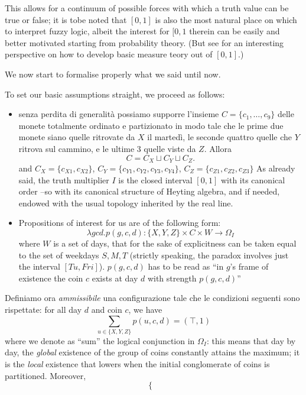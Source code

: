 \begin{example}
  This allows for a continuum of possible forces with which a truth value can be true or false;  it is tobe noted that $[0,1]$ is also the most natural place on which to interpret fuzzy logic, albeit the interest for $[0,1$ therein can be easily and better motivated starting from probability theory. (But see \cite{} for an interesting perspective on how to develop basic measure teory out of $[0,1]$.)

  We now start to formalise properly what we said until now.

  To set our basic assumptions straight, we proceed as follows:
  \begin{itemize}
    \item senza perdita di generalità possiamo supporre l'insieme $C = \{c_1,\dots,c_9\}$ delle monete totalmente ordinato e partizionato in modo tale che le prime due monete siano quelle ritrovate da $X$ il martedì, le seconde quattro quelle che $Y$ ritrova sul cammino, e le ultime 3 quelle viste da $Z$. Allora
    \[C = C_X \sqcup C_Y \sqcup C_Z.\]
    and $C_X = \{c_{X1}, c_{X2}\}$, $C_Y = \{
    c_{Y1},c_{Y2},c_{Y3},c_{Y4}\}$, $C_Z= \{c_{Z1}, c_{Z2}, c_{Z3}\}$ As already said, the truth multiplier $I$ is the closed interval $[0,1]$ with its canonical order --so with its canonical structure of Heyting algebra, and if needed, endowed with the usual topology inherited by the real line.%
    \item Propositions of interest for us are of the following form:%
    \[\lambda gcd.p(g, c, d) : \{X,Y,Z\}\times C\times W \to \Omega_I\]
    where $W$ is a set of days, that for the sake of explicitness can be taken equal to the set of weekdays $S,M,T$ (strictly speaking, the paradox involves just the interval $[Tu,Fri]$). $p(g,c,d)$ has to be read as ``in $g$'s frame of existence the coin $c$ exists at day $d$ with strength $p(g,c,d)$''
  \end{itemize}
  Definiamo ora \emph{ammissibile} una configurazione tale che le condizioni seguenti sono rispettate: for all day $d$ and coin $c$, we have
  \[
    \sum_{u\in \{X,Y,Z\}} p(u,c,d) = (\top, 1) 
  \]
  where we denote as ``sum'' the logical conjunction in $\Omega_I$: this means that day by day, the \emph{global} existence of the group of coins constantly attains the maximum; it is the \emph{local} existence that lowers when the initial conglomerate of coins is partitioned. Moreover,
  \[
  \begin{cases}

\end{cases}\]
\end{example}
